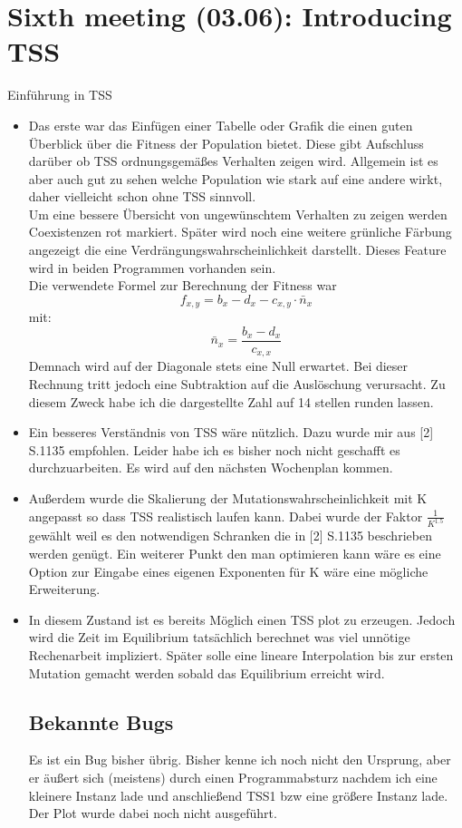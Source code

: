 \documentclass{article}
\begin{document}
\section{Sixth meeting (03.06): Introducing TSS}
Einführung in TSS
\begin{itemize}
\item Das erste war das Einfügen einer Tabelle oder Grafik die einen guten Überblick über die Fitness der Population bietet. Diese gibt Aufschluss darüber ob TSS ordnungsgemäßes Verhalten zeigen wird. Allgemein ist es aber auch gut zu sehen welche Population wie stark auf eine andere wirkt, daher vielleicht schon ohne TSS sinnvoll.\\
Um eine bessere Übersicht von ungewünschtem Verhalten zu zeigen werden Coexistenzen rot markiert. Später wird noch eine weitere grünliche Färbung angezeigt die eine Verdrängungswahrscheinlichkeit darstellt.
Dieses Feature wird in beiden Programmen vorhanden sein.\\
Die verwendete Formel zur Berechnung der Fitness war \[ f_{x,y} = b_x - d_x - c_{x,y}\cdot \bar{n}_x\]
mit:
\[ \bar{n}_x = \frac{b_x - d_x}{c_{x,x}}\]
Demnach wird auf der Diagonale stets eine Null erwartet. Bei dieser Rechnung tritt jedoch eine Subtraktion auf die Auslöschung verursacht. Zu diesem Zweck habe ich die dargestellte Zahl auf 14 stellen runden lassen.
\item Ein besseres Verständnis von TSS wäre nützlich. Dazu wurde mir aus [2] S.1135 empfohlen. Leider habe ich es bisher noch nicht geschafft es durchzuarbeiten. Es wird auf den nächsten Wochenplan kommen.
\item Außerdem wurde die Skalierung der Mutationswahrscheinlichkeit mit K angepasst so dass TSS realistisch laufen kann. Dabei wurde der Faktor $\frac{1}{K^{1.5}}$ gewählt weil es den notwendigen Schranken die in [2] S.1135 beschrieben werden genügt. Ein weiterer Punkt den man optimieren kann wäre es eine Option zur Eingabe eines eigenen Exponenten für K wäre eine mögliche Erweiterung.
\item In diesem Zustand ist es bereits Möglich einen TSS plot zu erzeugen. Jedoch wird die Zeit im Equilibrium tatsächlich berechnet was viel unnötige Rechenarbeit impliziert. Später solle eine lineare Interpolation bis zur ersten Mutation gemacht werden sobald das Equilibrium erreicht wird.  
\subsection{Bekannte Bugs}
Es ist ein Bug bisher übrig. Bisher kenne ich noch nicht den Ursprung, aber er äußert sich (meistens) durch einen Programmabsturz nachdem ich eine kleinere Instanz lade und anschließend TSS1 bzw eine größere Instanz lade. Der Plot wurde dabei noch nicht ausgeführt.
\end{itemize}
  
\end{document}
